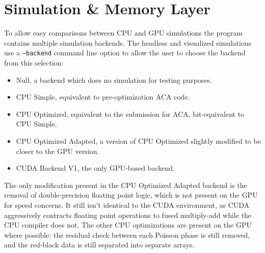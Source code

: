 \section{Simulation \& Memory Layer}

To allow easy comparisons between CPU and GPU simulations the program contains multiple simulation backends.
The headless and visualized simulations use a \texttt{--backend} command line option to allow the user to choose the backend from this selection:\label{sec:DesignBackends}
\begin{itemize}
    \item Null, a backend which does no simulation for testing purposes.
    \item CPU Simple, equivalent to pre-optimization ACA code.
    \item CPU Optimized, equivalent to the submission for ACA, bit-equivalent to CPU Simple.
    \item CPU Optimized Adapted, a version of CPU Optimized slightly modified to be closer to the GPU version.
    \item CUDA Backend V1, the only GPU-based backend.
\end{itemize}

The only modification present in the CPU Optimized Adapted backend is the removal of double-precision floating point logic, which is not present on the GPU for speed concerns.
It still isn't identical to the CUDA environment, as CUDA aggressively contracts floating point operations to fused multiply-add while the CPU compiler does not.
The other CPU optimizations are present on the GPU where possible: the residual check between each Poisson phase is still removed, and the red-black data is still separated into separate arrays. 


